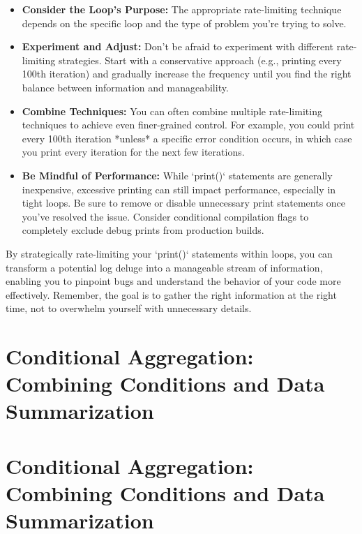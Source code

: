\documentclass{article}
\begin{document}
{{{\begin{itemize}
    \item \textbf{Consider the Loop's Purpose:} The appropriate rate-limiting technique depends on the specific loop and the type of problem you're trying to solve.

    \item \textbf{Experiment and Adjust:} Don't be afraid to experiment with different rate-limiting strategies. Start with a conservative approach (e.g., printing every 100th iteration) and gradually increase the frequency until you find the right balance between information and manageability.

    \item \textbf{Combine Techniques:} You can often combine multiple rate-limiting techniques to achieve even finer-grained control. For example, you could print every 100th iteration *unless* a specific error condition occurs, in which case you print every iteration for the next few iterations.

    \item \textbf{Be Mindful of Performance:} While `print()` statements are generally inexpensive, excessive printing can still impact performance, especially in tight loops. Be sure to remove or disable unnecessary print statements once you've resolved the issue. Consider conditional compilation flags to completely exclude debug prints from production builds.

\end{itemize}

By strategically rate-limiting your `print()` statements within loops, you can transform a potential log deluge into a manageable stream of information, enabling you to pinpoint bugs and understand the behavior of your code more effectively. Remember, the goal is to gather the right information at the right time, not to overwhelm yourself with unnecessary details.

\newpage

\section*{Conditional Aggregation: Combining Conditions and Data Summarization} %
\label{chapter-4-8-Conditional_Aggregation__Combining_Condi}

\section*{Conditional Aggregation: Combining Conditions and Data Summarization}

}}}
\end{document}
